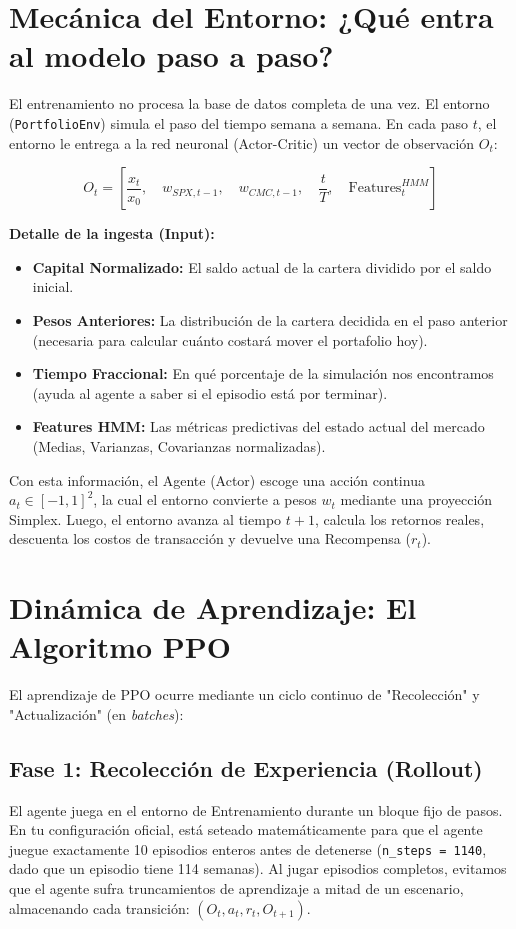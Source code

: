 \documentclass[12pt,a4paper]{article}
\begin{document}
\section{Mecánica del Entorno: ¿Qué entra al modelo paso a paso?}

El entrenamiento no procesa la base de datos completa de una vez. El entorno (\texttt{PortfolioEnv}) simula el paso del tiempo semana a semana. En cada paso $t$, el entorno le entrega a la red neuronal (Actor-Critic) un vector de observación $O_t$:

\begin{equation}
O_t = \left[ \frac{x_t}{x_0}, \quad w_{SPX, t-1}, \quad w_{CMC, t-1}, \quad \frac{t}{T}, \quad \text{Features}_{t}^{HMM} \right]
\end{equation}

\textbf{Detalle de la ingesta (Input):}
\begin{itemize}
    \item \textbf{Capital Normalizado:} El saldo actual de la cartera dividido por el saldo inicial.
    \item \textbf{Pesos Anteriores:} La distribución de la cartera decidida en el paso anterior (necesaria para calcular cuánto costará mover el portafolio hoy).
    \item \textbf{Tiempo Fraccional:} En qué porcentaje de la simulación nos encontramos (ayuda al agente a saber si el episodio está por terminar).
    \item \textbf{Features HMM:} Las métricas predictivas del estado actual del mercado (Medias, Varianzas, Covarianzas normalizadas).
\end{itemize}

Con esta información, el Agente (Actor) escoge una acción continua $a_t \in [-1, 1]^2$, la cual el entorno convierte a pesos $w_t$ mediante una proyección Simplex. Luego, el entorno avanza al tiempo $t+1$, calcula los retornos reales, descuenta los costos de transacción y devuelve una Recompensa ($r_t$).

\section{Dinámica de Aprendizaje: El Algoritmo PPO}

El aprendizaje de PPO ocurre mediante un ciclo continuo de "Recolección" y "Actualización" (en \textit{batches}):

\subsection{Fase 1: Recolección de Experiencia (Rollout)}
El agente juega en el entorno de Entrenamiento durante un bloque fijo de pasos. En tu configuración oficial, está seteado matemáticamente para que el agente juegue exactamente 10 episodios enteros antes de detenerse (\texttt{n\_steps = 1140}, dado que un episodio tiene 114 semanas). Al jugar episodios completos, evitamos que el agente sufra truncamientos de aprendizaje a mitad de un escenario, almacenando cada transición: $(O_t, a_t, r_t, O_{t+1})$.
\end{document}
